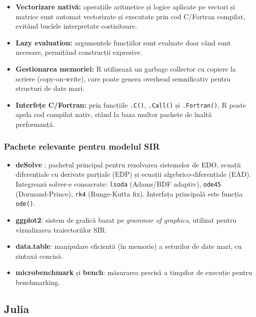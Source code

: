 \begin{itemize}
    \item \textbf{Vectorizare nativă:} operațiile aritmetice și logice aplicate
    pe vectori și matrice sunt automat vectorizate și executate prin cod C/Fortran
    compilat, evitând buclele interpretate costisitoare.
    \item \textbf{Lazy evaluation:} argumentele funcțiilor sunt evaluate doar
    când sunt necesare, permițând construcții expresive.
    \item \textbf{Gestionarea memoriei:} R utilizează un garbage collector cu
    copiere la scriere (copy-on-write), care poate genera overhead semnificativ
    pentru structuri de date mari.
    \item \textbf{Interfețe C/Fortran:} prin funcțiile \texttt{.C()},
    \texttt{.Call()} și \texttt{.Fortran()}, R poate apela cod compilat nativ,
    stând la baza multor pachete de înaltă performanță.
\end{itemize}

\subsubsection{Pachete relevante pentru modelul SIR}

\begin{itemize}
    \item \textbf{deSolve} \cite{hairer1993}: pachetul principal pentru
    rezolvarea sistemelor de EDO, ecuații diferențiale cu derivate parțiale
    (EDP) și ecuații algebrico-diferențiale (EAD). Integrează solver-e
    consacrate: \texttt{lsoda} (Adams/BDF adaptiv), \texttt{ode45}
    (Dormand-Prince), \texttt{rk4} (Runge-Kutta fix). Interfața principală
    este funcția \texttt{ode()}.
    \item \textbf{ggplot2}: sistem de grafică bazat pe \emph{grammar of graphics},
    utilizat pentru vizualizarea traiectoriilor SIR.
    \item \textbf{data.table}: manipulare eficientă (în memorie) a seturilor
    de date mari, cu sintaxă concisă.
    \item \textbf{microbenchmark} și \textbf{bench}: măsurarea precisă a
    timpilor de execuție pentru benchmarking.
\end{itemize}

\subsection{Julia}
\label{subsec:julia}

